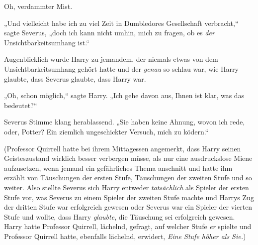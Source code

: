 Oh, verdammter Mist.

„Und vielleicht habe ich zu viel Zeit in Dumbledores Gesellschaft verbracht,“ sagte Severus, „doch ich kann nicht umhin, mich zu fragen, ob es \emph{der} Unsichtbarkeitsumhang ist.“

Augenblicklich wurde Harry zu jemandem, der niemals etwas von dem Unsichtbarkeitsumhang gehört hatte und der \emph{genau} so schlau war, wie Harry glaubte, dass Severus glaubte, dass Harry war.

„Oh, schon möglich,“ sagte Harry. „Ich gehe davon aus, Ihnen ist klar, was das bedeutet?“

Severus Stimme klang herablassend. „Sie haben keine Ahnung, wovon ich rede, oder, Potter? Ein ziemlich ungeschickter Versuch, mich zu ködern.“

(Professor Quirrell hatte bei ihrem Mittagessen angemerkt, dass Harry seinen Geisteszustand wirklich besser verbergen müsse, als nur eine ausdruckslose Miene aufzusetzen, wenn jemand ein gefährliches Thema anschnitt und hatte ihm erzählt von Täuschungen der ersten Stufe, Täuschungen der zweiten Stufe und so weiter. Also stellte Severus sich Harry entweder \emph{tatsächlich} als Spieler der ersten Stufe vor, was Severus zu einem Spieler der zweiten Stufe machte und Harrys Zug der dritten Stufe war erfolgreich gewesen oder Severus war ein Spieler der vierten Stufe und wollte, dass Harry \emph{glaubte}, die Täuschung sei erfolgreich gewesen. Harry hatte Professor Quirrell, lächelnd, gefragt, auf welcher Stufe \emph{er} spielte und Professor Quirrell hatte, ebenfalls lächelnd, erwidert, \emph{Eine Stufe höher als Sie.})

